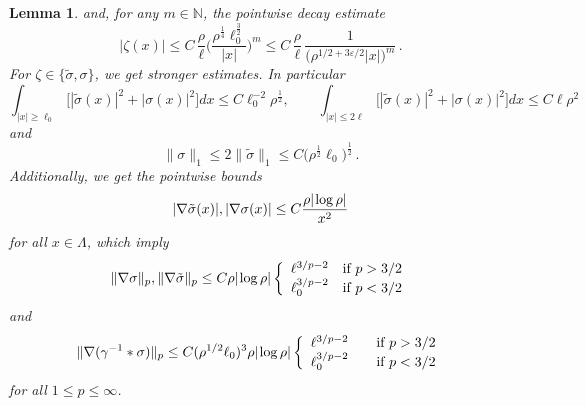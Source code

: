 \documentclass[a4paper,11pt]{article}
\def\bN{\mathbb{N}}
\def\eps{\varepsilon}
\let\io=\infty
\newtheorem{lemma}[theorem]{Lemma}
\numberwithin{equation}{section}
\begin{document}
\begin{lemma}
and, for any $m \in \bN$, the pointwise decay estimate 
\begin{equation}
            \label{eq:decay}
 |\zeta(x)|  \leq C \, \frac{\rho}{\ell}\Big( \frac{\rho^{\frac{1}{4}}\ell_0^{\frac{3}{2}}}{|x|}\Big)^m \leq C \, \frac{\rho}{\ell} \, \frac{1}{\big( \rho^{1/2+3\eps/2} |x| \big)^{m}} \,.
\end{equation}
For $\zeta \in \{ \tilde{\sigma}, \sigma \}$, we get stronger estimates. In particular
\begin{equation}\label{eq:s2-restricted}
\int_{|x|\geq \ell_0} \big[ |\tilde{\sigma} (x)|^2 + |\sigma (x)|^2 \big] dx  \leq C\ell_0^{-2}\rho^{\frac{1}{2}}  , \qquad  \int_{|x|\leq  2\ell} 
 \big[ |\tilde{\sigma} (x)|^2 + | \sigma (x)|^2 \big] dx \leq C\ell\rho^{2}
 \end{equation} 
and  
\begin{equation} 
            \label{Th:est_3}
             \|\sigma\|_1  \leq 2\|\tilde \sigma\|_1\leq C \big( \rho^{\frac{1}{2}}\ell_0\big)^\frac{1}{2}\,.
             \end{equation}
Additionally, we get the pointwise bounds 
\begin{equation}\label{eq:snabla-point} |\nabla \tilde{\sigma} (x)| , |\nabla \sigma (x) | \leq C \frac{\rho | \hspace{-.03cm} \log \rho|}{x^2} \end{equation} 
for all $x \in \Lambda$, which imply  
\begin{equation}\label{eq:snabla-p}\| \nabla \sigma \|_p, \| \nabla \tilde{\sigma} \|_p  \leq C \rho |\hspace{-.03cm} \log \rho  | \left\{ \begin{array}{ll}  \ell^{3/p-2} \quad \text{if } p > 3/2 \\ \ell_0^{3/p-2} \quad \text{if } p < 3/2 \end{array} \right.\end{equation} 
and
\begin{equation}\label{eq:nu-nabla-p} \| \nabla (\gamma^{-1}*\sigma) \|_p  \leq C (\rho^{1/2} \ell_0 )^3 \rho |\hspace{-.03cm} \log \rho | \left\{ \begin{array}{ll}  \ell^{3/p-2} \quad &\text{if } p > 3/2 \\  \ell_0^{3/p-2} \quad &\text{if } p < 3/2 \end{array} \right.\end{equation} 
for all $1 \leq p \leq \infty$.
\end{lemma}
\end{document}
